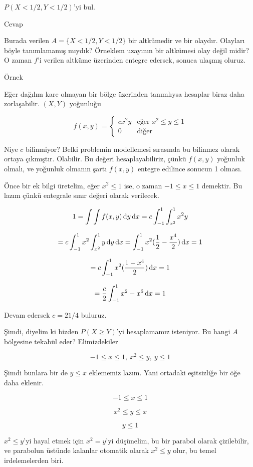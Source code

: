 \documentclass[12pt,fleqn]{article}\usepackage{../../common}
\begin{document}
$P(X < 1/2, Y < 1/2)$'yi bul. 

Cevap

Burada verilen $A = \{ X < 1/2, Y < 1/2\}$ bir altkümedir ve bir
olaydır. Olayları böyle tanımlamamış mıydık? Örneklem uzayının bir
altkümesi olay değil midir? O zaman $f$'i verilen altküme üzerinden entegre
edersek, sonuca ulaşmış oluruz. 

Örnek 

Eğer dağılım kare olmayan bir bölge üzerinden tanımlıysa hesaplar biraz
daha zorlaşabilir. $(X,Y)$ yoğunluğu 

$$ 
f(x,y) = 
\left\{ \begin{array}{ll}
cx^2y & \textrm{eğer } x^2 \le y \le 1 \\
0 & \textrm{diğer}
\end{array} \right.
 $$

Niye $c$ bilinmiyor? Belki problemin modellemesi sırasında bu bilinmez
olarak ortaya çıkmıştır. Olabilir. Bu değeri hesaplayabiliriz, çünkü
$f(x,y)$ yoğunluk olmalı, ve yoğunluk olmanın şartı $f(x,y)$ entegre
edilince sonucun 1 olması. 

Önce bir ek bilgi üretelim, eğer $x^2 \le 1$ ise, o zaman $-1 \le x \le 1$ 
demektir. Bu lazım çünkü entegrale sınır değeri olarak verilecek. 

$$ 1 = \int  \int f(x,y) \,\mathrm{d} y \,\mathrm{d} x = c \int _{ -1}^{1} \int _{ x^2}^{1}x^2y  $$

$$
=  c \int _{ -1}^{1} x^2 \int _{ x^2}^{1} y \,\mathrm{d} y \,\mathrm{d} x = 
\int _{ -1}^{1} x^2 (\frac{ 1}{2} - \frac{ x^4}{2} ) \,\mathrm{d} x = 1
$$

$$ = c \int _{ -1}^{1} x^2 (\frac{ 1 - x^4}{2} ) \,\mathrm{d} x = 1 $$

$$ = \frac{ c}{2} \int _{ -1}^{1} x^2 - x^6 \,\mathrm{d} x  = 1$$

Devam edersek $c = 21/4$ buluruz. 

Şimdi, diyelim ki bizden $P(X \ge Y)$'yi hesaplamamız isteniyor. Bu hangi
$A$ bölgesine tekabül eder? Elimizdekiler

$$ -1 \le x \le 1, \  x^2 \le y, \ y \le 1   $$

Şimdi bunlara bir de $y \le x$ eklememiz lazım. Yani ortadaki eşitsizliğe
bir öğe daha eklenir.

$$ -1 \le x \le 1 $$

$$  x^2 \le y \le x $$

$$  y \le 1   $$

$x^2 \le y$'yi hayal etmek için $x^2 = y$'yi düşünelim, bu bir parabol
olarak çizilebilir, ve parabolun üstünde kalanlar otomatik olarak $x^2 \le y$ 
olur, bu temel irdelemelerden biri. 
\end{document}
